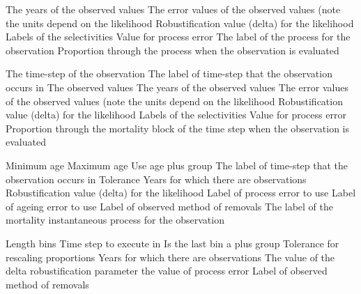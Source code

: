  {The years of the observed values}
 {The error values of the observed values (note the units depend on the likelihood}
 {Robustification value (delta) for the likelihood}
 {Labels of the selectivities}
 {Value for process error}
 {The label of the process for the observation}
 {Proportion through the process when the observation is evaluated}
\par\textbf{}\par
{} {The time-step of the observation}
 {The label of time-step that the observation occurs in}
 {The observed values}
 {The years of the observed values}
 {The error values of the observed values (note the units depend on the likelihood}
 {Robustification value (delta) for the likelihood}
 {Labels of the selectivities}
 {Value for process error}
 {Proportion through the mortality block of the time step when the observation is evaluated}
\par\textbf{}\par
{} {Minimum age}
 {Maximum age}
 {Use age plus group}
 {The label of time-step that the observation occurs in}
 {Tolerance}
 {Years for which there are observations}
 {Robustification value (delta) for the likelihood}
 {Label of process error to use}
 {Label of ageing error to use}
 {Label of observed method of removals}
 {The label of the mortality instantaneous process for the observation}
\par\textbf{}\par
{} {Length bins}
 {Time step to execute in}
 {Is the last bin a plus group}
 {Tolerance for rescaling proportions}
 {Years for which there are observations}
 {The value of the delta robustification parameter}
 {the value of process error}
 {Label of observed method of removals}
